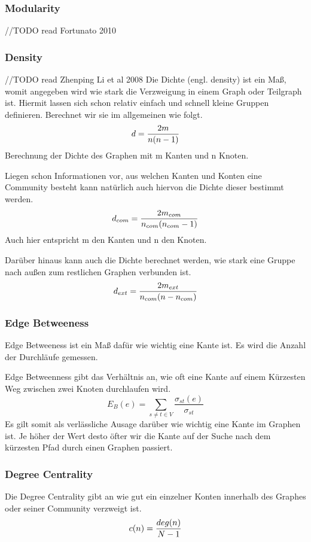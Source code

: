 \subsubsection{Modularity}\label{Modularity}
//TODO read Fortunato 2010

\subsubsection{Density}\label{Density}
//TODO read Zhenping Li et al 2008
Die Dichte (engl. density) ist ein Maß, womit angegeben wird wie stark die Verzweigung in einem Graph oder Teilgraph ist. Hiermit lassen sich schon relativ einfach und schnell kleine Gruppen definieren. Berechnet wir sie im allgemeinen wie folgt. \[ d = {2m \over n(n-1)} \] Berechnung der Dichte des Graphen mit m Kanten und n Knoten. 

Liegen schon Informationen vor, aus welchen Kanten und Konten eine Community besteht kann natürlich auch hiervon die Dichte dieser bestimmt werden. \[ d_{com} = {2m_{com} \over n_{com}(n_{com}-1)} \] Auch hier entspricht m den Kanten und n den Knoten.

Darüber hinaus kann auch die Dichte berechnet werden, wie stark eine Gruppe nach außen zum restlichen Graphen verbunden ist. \[ d_{ext} = {2m_{ext} \over n_{com}(n-n_{com})} \]

\subsubsection{Edge Betweeness}\label{Edge Betweeness}
Edge Betweeness ist ein Maß dafür wie wichtig eine Kante ist. Es wird die Anzahl der Durchläufe gemessen.

Edge Betweenness gibt das Verhältnis an, wie oft eine Kante auf einem Kürzesten Weg  zwischen zwei Knoten durchlaufen wird. \[E_B(e)= \sum_{s \neq t \in V}\frac{\sigma_{st}(e)}{\sigma_{st}}\] Es gilt somit als verlässliche Ausage darüber wie wichtig eine Kante im Graphen ist. Je höher der Wert desto öfter wir die Kante auf der Suche nach dem kürzesten Pfad durch einen Graphen passiert.


\subsubsection{Degree Centrality}\label{Degree Centrality}
Die Degree Centrality gibt an wie gut ein einzelner Konten innerhalb des Graphes oder seiner Community verzweigt ist. \[c(n) = {deg(n) \over N-1}\]

